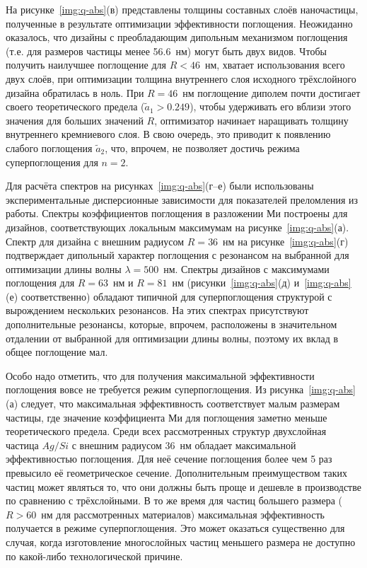 На рисунке~\ref{img:q-abs}(в) представлены толщины составных слоёв
наночастицы, полученные в результате оптимизации эффективности
поглощения.  Неожиданно оказалось, что дизайны с преобладающим
дипольным механизмом поглощения (т.е. для размеров частицы менее
56.6~нм) могут быть двух видов.  Чтобы получить наилучшее поглощение
для $R<46$~нм, хватает использования всего двух слоёв, при оптимизации
толщина внутреннего слоя исходного трёхслойного дизайна обратилась в
ноль.  При $R=46$~нм поглощение диполем почти достигает своего
теоретического предела ($\tilde{a}_1>0.249$), чтобы удерживать его
вблизи этого значения для больших значений $R$, оптимизатор начинает
наращивать толщину внутреннего кремниевого слоя.  В свою очередь, это
приводит к появлению слабого поглощения  $\tilde{a}_2$,
что, впрочем, не позволяет достичь режима суперпоглощения для $n=2$.

Для расчёта спектров на рисунках~\ref{img:q-abs}(г--е) были
использованы экспериментальные дисперсионные зависимости для
показателей преломления из работы\cite{palik-1997}. Спектры
коэффициентов поглощения в разложении Ми построены для дизайнов,
соответствующих локальным максимумам на
рисунке~\ref{img:q-abs}(а). Спектр для дизайна с внешним радиусом
$R=36$~нм на рисунке~\ref{img:q-abs}(г) подтверждает дипольный
характер поглощения с резонансом на выбранной для оптимизации длины
волны $\lambda=500$~нм.  Спектры дизайнов с максимумами поглощения для
$R=63$~нм и $R=81$~нм (рисунки~\ref{img:q-abs}(д) и~\ref{img:q-abs}(е)
соответственно) обладают типичной для суперпоглощения структурой с
вырождением нескольких резонансов. На этих спектрах присутствуют
дополнительные резонансы, которые, впрочем, расположены в значительном
отдалении от выбранной для оптимизации длины волны, поэтому их вклад в
общее поглощение мал.

Особо надо отметить, что для получения максимальной эффективности
поглощения вовсе не требуется режим суперпоглощения.  Из
рисунка~\ref{img:q-abs}(а) следует, что максимальная эффективность
соответствует малым размерам частицы, где значение коэффициента Ми для
поглощения заметно меньше теоретического предела.  Среди всех
рассмотренных структур двухслойная частица $Ag/Si$ с внешним радиусом
36~нм обладает максимальной эффективностью поглощения.  Для неё
сечение поглощения более чем 5 раз превысило её геометрическое
сечение. Дополнительным преимуществом таких частиц может являться то,
что они должны быть проще и дешевле в производстве по сравнению с
трёхслойными.  В то же время для частиц большего размера ($R>60$~нм
для рассмотренных материалов) максимальная эффективность получается в
режиме суперпоглощения.  Это может оказаться существенно для случая,
когда изготовление многослойных частиц меньшего размера не доступно по
какой-либо технологической причине.



